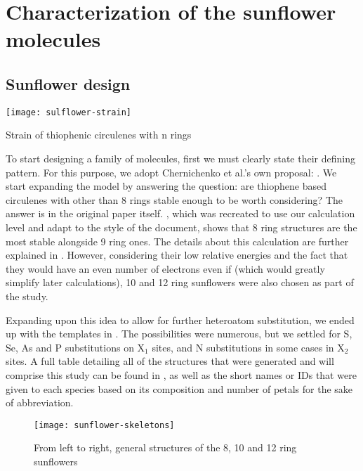 \chapter{Characterization of the sunflower molecules}

\section{Sunflower design}

\begin{marginfigure}
    \texttt{[image: sulflower-strain]}
    \caption[Strain of thiophenic circulenes]{Strain of thiophenic circulenes with n rings}
\end{marginfigure}

To start designing a family of molecules, first we must clearly state their defining pattern.
For this purpose, we adopt Chernichenko et al.'s own proposal: .
We start expanding the model by answering the question: are thiophene based circulenes with other than 8 rings stable enough to be worth considering?
The answer is in the original paper itself.
, which was recreated to use our calculation level and adapt to the style of the document, shows that 8 ring structures are the most stable alongside 9 ring ones.
The details about this calculation are further explained in .
However, considering their low relative energies and the fact that they would have an even number of electrons even if (which would greatly simplify later calculations), 10 and 12 ring sunflowers were also chosen as part of the study.

Expanding upon this idea to allow for further heteroatom substitution, we ended up with the templates in .
The possibilities were numerous, but we settled for S, Se, As and P substitutions on X$_1$ sites, and N substitutions in some cases in X$_2$ sites.
A full table detailing all of the structures that were generated and will comprise this study can be found in , as well as the short names or IDs that were given to each species based on its composition and number of petals for the sake of abbreviation.

\begin{figure*}
    \centering
    \texttt{[image: sunflower-skeletons]}
    \caption[General structures of the sunflower family]{From left to right, general structures of the 8, 10 and 12 ring sunflowers}
\end{figure*}

